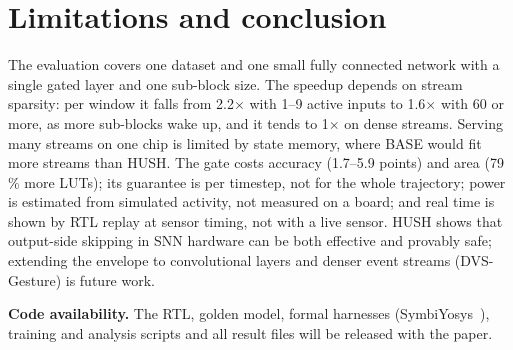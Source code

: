 \documentclass[conference]{IEEEtran}
\begin{document}
\section{Limitations and conclusion}
The evaluation covers one dataset and one small fully connected network with a single gated layer and one
sub-block size. The speedup depends on stream sparsity: per window it falls from 2.2$\times$ with 1--9 active inputs to
1.6$\times$ with 60 or more, as more sub-blocks wake up, and it tends to 1$\times$ on dense streams. Serving many
streams on one chip is limited by state memory, where BASE would fit more streams than HUSH. The gate costs
accuracy (1.7--5.9 points) and area (79\,\% more LUTs);
its guarantee is per timestep, not for the whole trajectory; power is estimated from simulated activity, not measured
on a board; and real time is shown by RTL replay at sensor timing, not with a live sensor. HUSH shows that output-side skipping in SNN hardware can be both effective and provably safe; extending
the envelope to convolutional layers and denser event streams (DVS-Gesture) is future work.

\textbf{Code availability.} The RTL, golden model, formal harnesses (SymbiYosys~\cite{sby}), training and
analysis scripts and all result files will be released with the paper.



\end{document}
